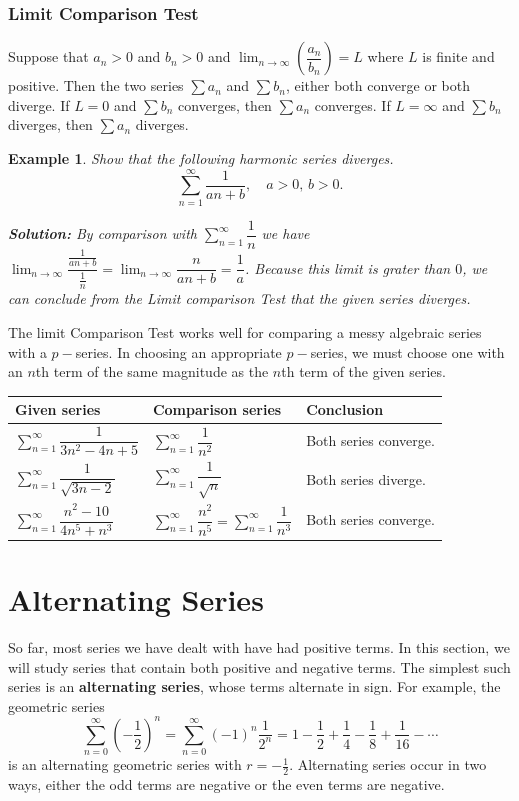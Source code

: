 \documentclass[titlepage,a4paper,12pt]{report}
\newtheorem{example}{Example}[section]
\begin{document}
\subsubsection{Limit Comparison Test}
Suppose that $a_n>0$ and $b_n>0$ and $\displaystyle \lim _{n\rightarrow \infty}\left(\dfrac{a_n}{b_n}\right)=L$ where $L$ is finite and positive. Then the two series $\displaystyle \sum a_n$ and $\displaystyle \sum b_n$, either both converge or both diverge. If $L=0$ and $\displaystyle \sum b_n$ converges, then $\displaystyle \sum a_n$ converges. If $L=\infty$ and $\displaystyle \sum b_n$ diverges, then $\displaystyle \sum a_n$ diverges.

\begin{example}
Show that the following harmonic series diverges.
\[\sum _{n=1}^\infty \dfrac{1}{an+b}, \quad a>0, \, b>0.\]

\noindent \textbf{Solution:} By comparison with $\displaystyle \sum _{n=1}^\infty \dfrac{1}{n}$ we have $\displaystyle \lim _{n\rightarrow \infty} \dfrac{\frac{1}{an+b}}{\frac{1}{n}}=\lim _{n\rightarrow \infty}\dfrac{n}{an+b}=\dfrac{1}{a}$. Because this limit is grater than $0$, we can conclude from the Limit comparison Test that the given series diverges.
\end{example}
\noindent The limit Comparison Test works well for comparing a messy algebraic series with a $p-$series. In choosing an appropriate $p-$series, we must choose one with an $n$th term of the same magnitude as the $n$th term of the given series.
\begin{center}
  \begin{tabular}{ l |l |l }
 
    Given series & Comparison series & Conclusion \\ \hline
    $\displaystyle \sum _{n=1}^\infty \dfrac{1}{3n^2-4n+5}$ & $\displaystyle \sum _{n=1}^\infty \dfrac{1}{n^2}$ & Both series converge. \\ \hline
    $\displaystyle \sum _{n=1}^\infty \dfrac{1}{\sqrt{3n-2}}$ & $\displaystyle \sum _{n=1}^\infty \dfrac{1}{\sqrt{n}}$ & Both series diverge. \\
    \hline
    $\displaystyle \sum _{n=1}^\infty \dfrac{n^2-10}{4n^5+n^3}$ & $ \displaystyle \sum _{n=1}^\infty \dfrac{n^2}{n^5}=\sum _{n=1}^\infty \dfrac{1}{n^3}$ & Both series converge.\\ \hline
  \end{tabular}
\end{center}
\section{Alternating Series}
So far, most series we have dealt with have had positive terms. In this section, we will study series that contain both positive and negative terms. The simplest such series is an \textbf{alternating series}, whose terms alternate in sign. For example, the geometric series
\[\sum _{n=0}^\infty \left(-\dfrac{1}{2}\right)^n=\sum _{n=0}^\infty (-1)^n \dfrac{1}{2^n}=1-\dfrac{1}{2}+\dfrac{1}{4}-\dfrac{1}{8}+\dfrac{1}{16}-\cdots \]
is an alternating geometric series with $r=-\frac{1}{2}$. Alternating series occur in two ways, either the odd terms are negative or the even terms are negative.
\end{document}
